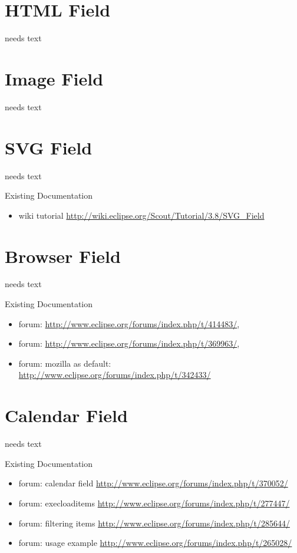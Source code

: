 \documentclass[a4paper,10pt,twoside]{book}
\begin{document}
\section{HTML Field}
needs text

\section{Image Field}
needs text

\section{SVG Field}
needs text

\noindent Existing Documentation
\begin{itemize}
  \item wiki tutorial \url{http://wiki.eclipse.org/Scout/Tutorial/3.8/SVG_Field}
\end{itemize}

\section{Browser Field}
needs text

\noindent Existing Documentation
\begin{itemize}
  \item forum: \url{http://www.eclipse.org/forums/index.php/t/414483/}, 
  \item forum: \url{http://www.eclipse.org/forums/index.php/t/369963/}, 
  \item forum: mozilla as default: \url{http://www.eclipse.org/forums/index.php/t/342433/}
\end{itemize}

\section{Calendar Field}
needs text

\noindent Existing Documentation
\begin{itemize}
  \item forum: calendar field \url{http://www.eclipse.org/forums/index.php/t/370052/}
  \item forum: execloaditems \url{http://www.eclipse.org/forums/index.php/t/277447/}
  \item forum: filtering items \url{http://www.eclipse.org/forums/index.php/t/285644/}
  \item forum: usage example \url{http://www.eclipse.org/forums/index.php/t/265028/}
\end{itemize}
\end{document}
